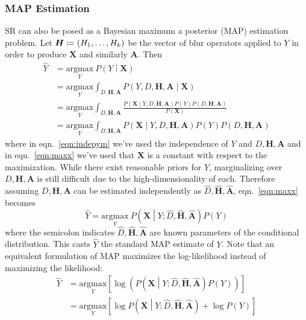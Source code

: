 \subsubsection{MAP Estimation}
SR can also be posed as a Bayesian maximum a posterior (MAP) estimation problem.
%
Let $\bm{H} \coloneqq \left( H_1, \mathellipsis, H_k \right)$ be the vector of blur operators applied to $Y$ in order to produce $\bm{X}$ and similarly $\bm{A}$.
%
Then
\begin{align}
	\hat{Y} & = \underset{Y}{\text{argmax}}~P\left( Y \middle| \bm{X} \right) \nonumber                                                                                                \\
	        & = \underset{Y}{\text{argmax}} \int_{D, \bm{H}, \bm{A}} P\left( Y, D, \bm{H}, \bm{A} \middle| \bm{X}\right) \nonumber                                                     \\
	        & = \underset{Y}{\text{argmax}} \int_{D, \bm{H}, \bm{A}} \frac{P\left(\bm{X} \middle| Y, D, \bm{H}, \bm{A} \right)P(Y) P(D, \bm{H}, \bm{A})}{P(\bm{X})}\label{eqn:indepym} \\
	        & = \underset{Y}{\text{argmax}} \int_{D, \bm{H}, \bm{A}} P\left(\bm{X} \middle| Y, D, \bm{H}, \bm{A} \right)P(Y) P(D, \bm{H}, \bm{A}) \label{eqn:maxx}
\end{align}
where in eqn.~\eqref{eqn:indepym} we've used the independence of $Y$ and $D, \bm{H}, \bm{A}$\cite{Hardie1997} and in eqn.~\eqref{eqn:maxx} we've used that $\bm{X}$ is a constant with respect to the maximization.
%
While there exist reasonable priors for $Y$, marginalizing over $D, \bm{H}, \bm{A}$ is still difficult due to the high-dimensionality of each.
%
Therefore assuming $D, \bm{H}, \bm{A}$ can be estimated independently as $\hat{D}, \hat{\bm{H}}, \hat{\bm{A}}$, eqn.~\eqref{eqn:maxx} becomes
\begin{equation}
	\hat{Y} = \underset{Y}{\text{argmax}}~P\left(\bm{X} \middle| Y; \hat{D}, \hat{\bm{H}}, \hat{\bm{A}} \right) P(Y)
	\label{eqn:map}
\end{equation}
where the semicolon indicates $\hat{D}, \hat{\bm{H}}, \hat{\bm{A}}$ are known parameters of the conditional distribution.
%
This casts $\hat{Y}$ the standard MAP estimate of $Y$.
%
Note that an equivalent formulation of MAP maximizes the log-likelihood instead of maximizing the likelihood:
\begin{align}
	\hat{Y} & = \underset{Y}{\text{argmax}}\left[ \log\left( P\left(\bm{X} \middle| Y; \hat{D},  \hat{\bm{H}}, \hat{\bm{A}}\right) P(Y) \right) \right]  \nonumber \\
	        & =  \underset{Y}{\text{argmax}}\left[ \log{P\left(\bm{X} \middle| Y; \hat{D},  \hat{\bm{H}}, \hat{\bm{A}} \right)} + \log{P(Y)} \right]
	\label{eqn:logmap}
\end{align}

